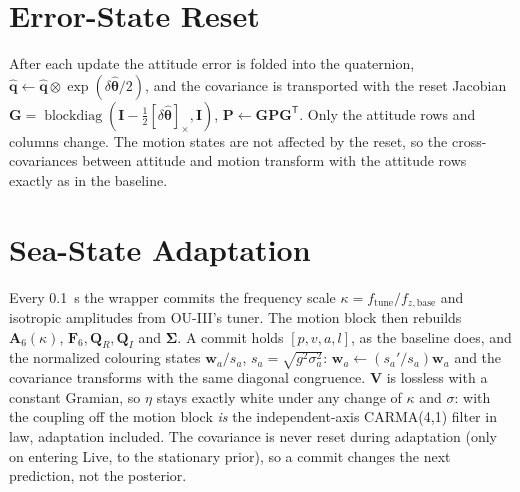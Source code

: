 \documentclass[conference]{IEEEtran}
\DeclareRobustCommand{\vct}[1]{\bm{#1}}
\DeclareRobustCommand{\mat}[1]{\bm{#1}}
\newcommand{\T}{^{\mathsf T}}
\theoremstyle{bodysmall}
\begin{document}
\section{Error-State Reset}
After each update the attitude error is folded into the quaternion,
$\hat{\vct q}\leftarrow\hat{\vct q}\otimes\exp(\delta\hat{\vct\theta}/2)$,
and the covariance is transported with the reset Jacobian
$\mat G=\operatorname{blockdiag}(\mat I-\tfrac12[\delta\hat{\vct\theta}]_\times,\mat I)$,
$\mat P\leftarrow\mat G\mat P\mat G\T$. Only the attitude rows and columns
change. The motion states are not affected by the reset, so the
cross-covariances between attitude and motion transform with the attitude
rows exactly as in the baseline.

\section{Sea-State Adaptation}
Every \SI{0.1}{s} the wrapper commits the frequency scale
$\kappa=f_{\mathrm{tune}}/f_{z,\mathrm{base}}$ and isotropic amplitudes from
OU-III's tuner. The motion block then rebuilds $\mat A_6(\kappa)$,
$\mat F_6,\mat Q_R,\mat Q_I$ and $\mat\Sigma$. A commit holds $[p,v,a,l]$,
as the baseline does, and the normalized colouring states
$\vct w_a/s_a$, $s_a=\sqrt{g^2\sigma_a^2}$: $\vct w_a\leftarrow(s_a'/s_a)\vct w_a$ and
the covariance transforms with the same diagonal congruence. $\mat V$ is
lossless with a constant Gramian, so $\eta$ stays exactly white under any
change of $\kappa$ and $\sigma$: with the coupling off the motion block
\emph{is} the independent-axis CARMA(4,1) filter in law, adaptation
included. The covariance is never reset during adaptation (only on entering
Live, to the stationary prior), so a commit changes the next prediction, not
the posterior.
\end{document}
